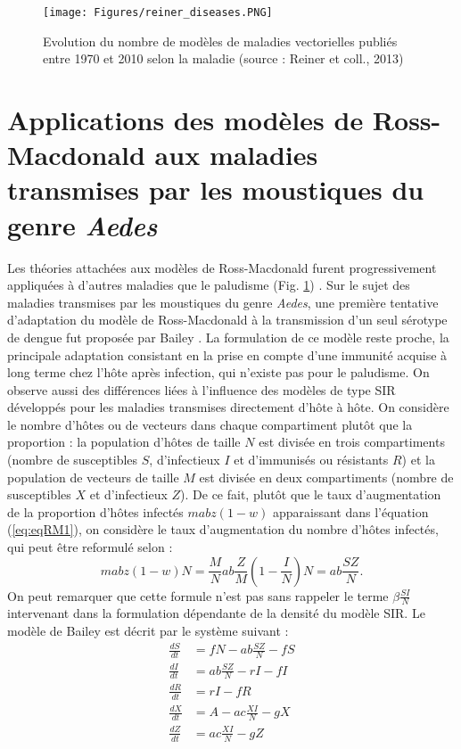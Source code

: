 \begin{figure}[t]
	\centering
	\texttt{[image: Figures/reiner\_diseases.PNG]}
	\caption{Evolution du nombre de modèles de maladies vectorielles publiés entre 1970 et 2010 selon la maladie (source : Reiner et coll., 2013)}
	\label{fig:reiner_diseases}
\end{figure}


\section[Applications aux maladies transmises par {\em Aedes}]{Applications des modèles de Ross-Macdonald aux maladies transmises par les moustiques du genre {\em Aedes}}

Les théories attachées aux modèles de Ross-Macdonald furent progressivement appliquées à d'autres maladies que le paludisme (Fig. \ref{fig:reiner_diseases}) \cite{reiner_systematic_2013}.
Sur le sujet des maladies transmises par les moustiques du genre {\em Aedes}, une première tentative d'adaptation du modèle de Ross-Macdonald à la transmission d'un seul sérotype de dengue fut proposée par Bailey \cite{bailey1975mathematical,andraud2012dynamic}.
La formulation de ce modèle reste proche, la principale adaptation consistant en la prise en compte d'une immunité acquise à long terme chez l'hôte après infection, qui n'existe pas pour le paludisme. 
On observe aussi des différences liées à l'influence des modèles de type SIR développés pour les maladies transmises directement d'hôte à hôte.
On considère le nombre d'hôtes ou de vecteurs dans chaque compartiment plutôt que la proportion : la population d'hôtes de taille $N$ est divisée en trois compartiments (nombre de susceptibles $S$, d'infectieux $I$ et d'immunisés ou résistants $R$) et la population de vecteurs de taille $M$ est divisée en deux compartiments (nombre de susceptibles $X$ et d'infectieux $Z$).
De ce fait, plutôt que le taux d'augmentation de la proportion d'hôtes infectés $mabz(1-w)$ apparaissant dans l'équation (\ref{eq:eqRM1}), on considère le taux d'augmentation du nombre d'hôtes infectés, qui peut être reformulé selon :
\begin{equation}
mabz(1-w)N = \frac{M}{N}ab\frac{Z}{M}(1-\frac{I}{N})N = ab\frac{SZ}{N}.
\end{equation}
On peut remarquer que cette formule n'est pas sans rappeler le terme $\beta\frac{SI}{N}$ intervenant dans la formulation dépendante de la densité du modèle SIR.
Le modèle de Bailey est décrit par le système suivant :
\begin{align}
\label{eq:bailey}
\frac{dS}{dt} &= fN - ab\frac{SZ}{N} - fS \\ \nonumber
\frac{dI}{dt} &= ab\frac{SZ}{N} - rI - fI \\ \nonumber
\frac{dR}{dt} &= rI - fR \\  \nonumber
\frac{dX}{dt} &= A - ac\frac{XI}{N} - gX \\ \nonumber
\frac{dZ}{dt} &= ac\frac{XI}{N} - gZ
\end{align}
